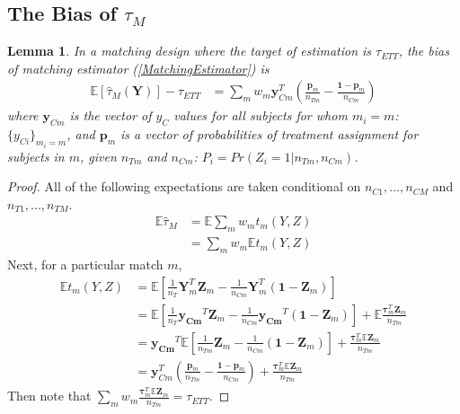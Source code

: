\documentclass[12pt]{article}\usepackage[]{graphicx}\usepackage[]{color}
\newcommand{\ncm}{n_{Cm}}
\newcommand{\ntm}{n_{Tm}}
\newcommand{\bycm}{\bm{y}_{Cm}}
\newcommand{\yci}{y_{Ci}}
\newcommand{\EE}{\mathbb{E}}
\newcommand{\Match}{M}
\newcommand{\match}{m}
\newtheorem{lemma}{Lemma}
\begin{document}
\subsection{The Bias of $\tau_\Match$}

\begin{lemma}\label{prop:matchBias}
In a matching design where the target of estimation is $\tau_{ETT}$, the bias of matching estimator (\ref{MatchingEstimator}) is
\begin{align*}\label{eq:matchBias}
\EE[\hat{\tau}_\Match (\bm{Y})]-\tau_{ETT}&= \sum_m w_m\bycm^T(\frac{\bm{p}_m}{\ntm}-\frac{\bm{1}-\bm{p}_m}{\ncm})
\end{align*}
where $\bycm$ is the vector of $y_C$ values for all subjects for whom $\match_i=m$: $\{\yci\}_{\match_i=m}$, and $\bm{p}_m$ is a vector of probabilities of treatment assignment for subjects in $m$, given $\ntm$ and $\ncm$: $P_i=Pr(Z_i=1|\ntm,\ncm)$.

\end{lemma}
\begin{proof}
All of the following expectations are taken conditional on $n_{C1},...,n_{CM}$ and $n_{T1},...,n_{TM}$.
\begin{align*}
	\EE\hat{\tau}_\Match&=\EE\sum_m w_m t_m(Y,Z)\\
	&=\sum_m w_m \EE t_m(Y,Z)
\end{align*}
Next, for a particular match $m$,
\begin{align*}
  \EE t_m(Y,Z) &= \EE[\frac{1}{n_T}  \bm{Y}_m^T\bm{Z}_m-\frac{1}{\ncm}\bm{Y}_m^T(\bm{1}-\bm{Z}_m)]\\
  &= \EE[\frac{1}{n_T}  \bm{y_{Cm}}^T\bm{Z}_m-\frac{1}{\ncm}\bm{y_{Cm}}^T(\bm{1}-\bm{Z}_m)]+\EE\frac{\bm{\tau}_m^T\bm{Z}_m}{\ntm}\\
  &=\bm{y_{Cm}}^T\EE[\frac{1}{\ntm}\bm{Z}_m-\frac{1}{\ncm}(\bm{1}-\bm{Z}_m)]+\frac{\bm{\tau}_m^T\EE\bm{Z}_m}{\ntm}\\
  &=\bycm^T(\frac{\bm{p}_m}{\ntm}-\frac{\bm{1}-\bm{p}_m}{\ncm})+\frac{\bm{\tau}_m^T\EE\bm{Z}_m}{\ntm}
\end{align*}
Then note that $\sum_m w_m
\frac{\bm{\tau}_m^T\EE\bm{Z}_m}{\ntm}=\tau_{ETT}$.
\end{proof}
\end{document}
